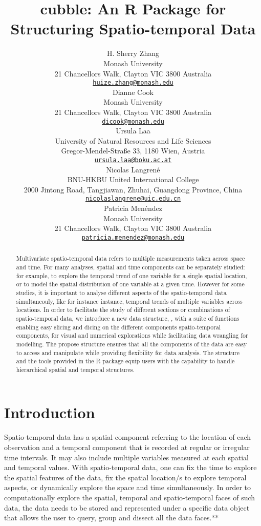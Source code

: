 \documentclass{article}
\title{cubble: An R Package for Structuring Spatio-temporal Data}
\author{
    H. Sherry Zhang
   \\
    Monash University \\
  21 Chancellors Walk, Clayton VIC 3800 Australia \\
  \texttt{\href{mailto:huize.zhang@monash.edu}{\nolinkurl{huize.zhang@monash.edu}}} \\
   \And
    Dianne Cook
   \\
    Monash University \\
  21 Chancellors Walk, Clayton VIC 3800 Australia \\
  \texttt{\href{mailto:dicook@monash.edu}{\nolinkurl{dicook@monash.edu}}} \\
   \And
    Ursula Laa
   \\
    University of Natural Resources and Life Sciences \\
  Gregor-Mendel-Straße 33, 1180 Wien, Austria \\
  \texttt{\href{mailto:ursula.laa@boku.ac.at}{\nolinkurl{ursula.laa@boku.ac.at}}} \\
   \And
    Nicolas Langrené
   \\
    BNU-HKBU United International College \\
  2000 Jintong Road, Tangjiawan, Zhuhai, Guangdong Province, China \\
  \texttt{\href{mailto:nicolaslangrene@uic.edu.cn}{\nolinkurl{nicolaslangrene@uic.edu.cn}}} \\
   \And
    Patricia Menéndez
   \\
    Monash University \\
  21 Chancellors Walk, Clayton VIC 3800 Australia \\
  \texttt{\href{mailto:patricia.menendez@monash.edu}{\nolinkurl{patricia.menendez@monash.edu}}} \\
  }
\begin{document}
\maketitle


\begin{abstract}
Multivariate spatio-temporal data refers to multiple measurements taken across space and time. For many analyses, spatial and time components can be separately studied: for example, to explore the temporal trend of one variable for a single spatial location, or to model the spatial distribution of one variable at a given time. However for some studies, it is important to analyse different aspects of the spatio-temporal data simultaneouly, like for instance instance, temporal trends of multiple variables across locations. In order to facilitate the study of different sections or combinations of spatio-temporal data, we introduce a new data structure, , with a suite of functions enabling easy slicing and dicing on the different components spatio-temporal components, for visual and numerical explorations while facilitating data wrangling for modelling. The propose  structure ensures that all the components of the data are easy to access and manipulate while providing flexibility for data analysis. The  structure and the tools provided in the  R package equip users with the capability to handle hierarchical spatial and temporal structures. \color{green}{The tools are illustrated with examples of Australian climate data, merging climate and river level data sources, reproducing a climate reanalysis (ERA5), and creating interactive graphics.}
\end{abstract}


\newpage

\hypertarget{introduction}{%
\section{Introduction}\label{introduction}}

Spatio-temporal data has a spatial component referring to the location of each observation and a temporal component that is recorded at regular or irregular time intervals. It may also include multiple variables measured at each spatial and temporal values. With spatio-temporal data, one can fix the time to explore the spatial features of the data, fix the spatial location/s to explore temporal aspects, or dynamically explore the space and time simultaneously.
In order to computationally explore the spatial, temporal and spatio-temporal faces of such data, the data needs to be stored and represented under a specific data object that allows the user to query, group and dissect all the data faces.**
\end{document}
